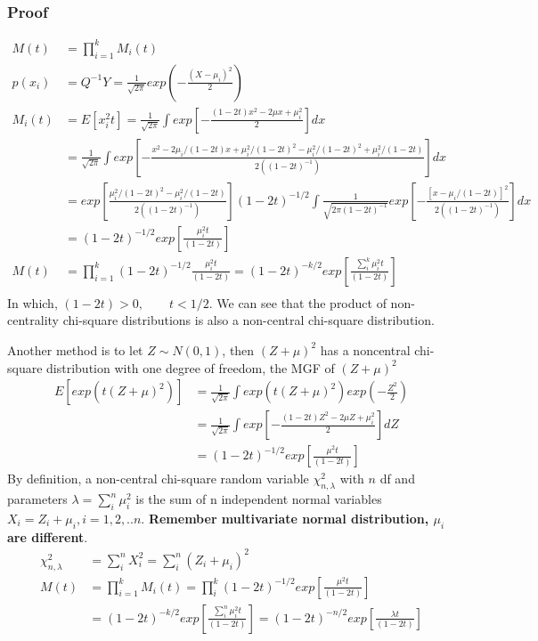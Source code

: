 \documentclass[11pt]{article} %
\begin{document}
\subsubsection{Proof}	
	\begin{align*}
		M(t) &= \prod_{i=1}^k M_i(t) \\
		p(x_i) &=  Q^{-1}Y = \frac{1}{\sqrt{2\pi}} exp(-\frac{(X-\mu_i)^2}{2})\\
	M_i(t)	&= E[x_i^2 t]= \frac{1}{\sqrt{2\pi}} \int exp[- \frac{(1-2t)x^2 - 2\mu x + \mu_i^2}{2}] dx\\
		&= \frac{1}{\sqrt{2\pi}} \int  exp[- \frac{x^2 - 2\mu_i/(1-2t) x + \mu_i^2/(1-2t)^2 - \mu_i^2/(1-2t)^2 + \mu_i^2/(1-2t)}{2 ((1-2t)^{-1})}] dx\\
		&= exp[\frac{\mu_i^2/(1-2t)^2 - \mu_i^2/(1-2t)}{2 ((1-2t)^{-1})}] (1-2t)^{-1/2} \int \frac{1}{\sqrt{2\pi (1-2t)^{-1}}} exp[- \frac{[x- \mu_i/(1-2t)]^2}{2 ((1-2t)^{-1})}] dx\\
		&= (1-2t)^{-1/2} exp[\frac{\mu_i^2 t}{(1-2t)}]\\
		M(t) &= \prod_{i=1}^k (1-2t)^{-1/2} \frac{\mu_i^2 t}{(1-2t)} = (1-2t)^{-k/2} exp[\frac{\sum_i^k \mu_i^2 t}{(1-2t)}] \\
	\end{align*}  
	In which, $(1-2t) > 0, \qquad t< 1/2$. We can see that the product of non-centrality chi-square distributions is also a non-central chi-square distribution.
	
	
	
	Another method is to let $Z \sim N(0,1)$, then $(Z+\mu)^2$ has a noncentral chi-square distribution with one degree of freedom, the MGF of $(Z+\mu)^2$
	\begin{align*}
		E[exp(t (Z+\mu)^2)] &=\frac{1}{\sqrt{2\pi}} \int exp(t (Z+\mu)^2)  exp(-\frac{Z^2}{2})\\
		&= \frac{1}{\sqrt{2\pi}} \int exp[- \frac{(1-2t)Z^2 - 2\mu Z + \mu_i^2}{2}] dZ\\
		&= (1-2t)^{-1/2} exp[\frac{\mu^2 t}{(1-2t)}]
	\end{align*} 
	By definition, a non-central chi-square random variable $\chi^2_{n,\lambda}$ with $n$ df and parameters $\lambda = \sum_i^n \mu_i^2$ is the sum of n independent normal variables $X_i = Z_i + \mu_i, i=1,2,..n$. \textbf{Remember multivariate normal distribution, $\mu_i$ are different}.
	\begin{align*}
		\chi^2_{n,\lambda} &= \sum_i^n X_i^2 = \sum_i^n (Z_i + \mu_i)^2 \\
		M(t) &= \prod_{i=1}^k M_i(t) =\prod_i^k (1-2t)^{-1/2} exp[\frac{\mu^2 t}{(1-2t)}] \\
		&= (1-2t)^{-k/2} exp[\frac{\sum_i^n \mu_i^2 t}{(1-2t)}] =(1-2t)^{-n/2} exp[\frac{\lambda t}{(1-2t)}]
	\end{align*}  
	
\end{document}
